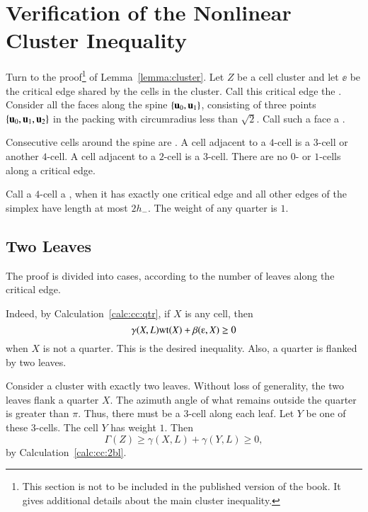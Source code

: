 \chapter{Verification of the Nonlinear Cluster Inequality}

Turn to the proof\footnote{This section is not to be included
in the published version of the book.  It gives additional details about the
main cluster inequality.} of Lemma~\ref{lemma:cluster}.  Let $Z$ be a cell
cluster and let $\ee$ be the critical edge shared by the cells in the
cluster.  Call this critical edge the .  Consider all
the faces along the spine $\{ {\mathbf u}_0, {\mathbf u}_1\}$, consisting of three
points $\{ {\mathbf u}_0, {\mathbf u}_1, {\mathbf u}_2\}$ in the packing with circumradius less
than $\sqrt2$.  Call such a face a . 

Consecutive cells around the spine are .  A cell
adjacent to a $4$-cell is a $3$-cell or another $4$-cell.  A cell
adjacent to a $2$-cell is a $3$-cell.  There are no $0$- or $1$-cells
along a critical edge.   %

Call a $4$-cell a , when it has exactly one critical
edge and all other edges of the simplex have length at most $2 h_-$.
The weight of any quarter is $1$.


\section{Two Leaves}

The proof is  divided into cases, according to the number of
leaves along the critical edge.

 Indeed, by
Calculation~\ref{calc:cc:qtr}, if $X$ is any cell,
then %
\[  
\gamma(X,L) \op{wt}(X) + \beta(\ee,X)\ge 0
\]  
when $X$ is not a quarter.  This is the desired inequality.  Also, a
quarter is flanked by two leaves.

Consider a cluster with exactly two leaves.
Without loss of generality, the two leaves flank a quarter
$X$. 
The azimuth angle of what remains outside the quarter
is greater than $\pi$.  Thus, there must be a $3$-cell
along each leaf.  Let $Y$ be one of these $3$-cells.
The cell $Y$ has weight $1$.
Then 
\begin{equation}\label{eqn:cc2bl} 
\Gamma(Z)\ge \gamma(X,L)+\gamma(Y,L)\ge 0,
\end{equation}
by Calculation~\ref{calc:cc:2bl}.

